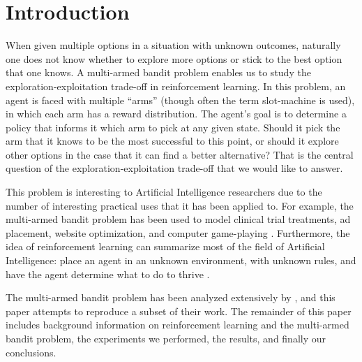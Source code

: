
\section{Introduction}
\label{sec:intro}

When given multiple options in a situation with unknown outcomes,
naturally one does not know whether to explore more options or stick
to the best option that one knows. A multi-armed bandit problem
enables us to study the exploration-exploitation trade-off in
reinforcement learning. In this problem, an agent is faced with
multiple ``arms'' (though often the term slot-machine is used), in
which each arm has a reward distribution. The agent's goal is to
determine a policy that informs it which arm to pick at any given
state. Should it pick the arm that it knows to be the most successful
to this point, or should it explore other options in the case that it
can find a better alternative? That is the central question of the
exploration-exploitation trade-off that we would like to answer.

This problem is interesting to Artificial Intelligence researchers due to
the number of interesting practical uses that it has been applied
to. For example, the multi-armed bandit problem has been used to model
clinical trial treatments, ad placement, website optimization, and 
computer game-playing \cite{bubeck}. Furthermore, the idea of
reinforcement learning can summarize most of the field of Artificial
Intelligence: place an agent in an unknown environment, with unknown
rules, and have the agent determine what to do to thrive \cite{aima}.

The multi-armed bandit problem has been analyzed extensively by
\cite{auer}, and this paper attempts to reproduce a subset of their
work. The remainder of this paper includes background information on
reinforcement learning and the multi-armed bandit problem, the
experiments we performed, the results, and finally our conclusions.



